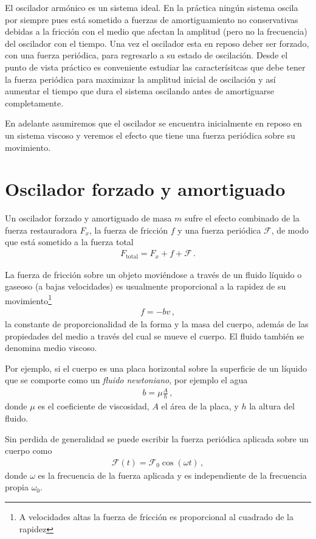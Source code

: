 El oscilador armónico es un sistema ideal. En la práctica ningún sistema oscila por siempre pues está sometido a fuerzas de amortiguamiento no conservativas debidas a la fricción con el medio que afectan la amplitud (pero no la frecuencia) del oscilador con el tiempo. Una vez el oscilador esta en reposo deber ser forzado, con una fuerza periódica, para regresarlo a su estado de oscilación. Desde el punto de vista práctico es conveniente estudiar las caracterísitcas que debe tener la fuerza periódica para maximizar la amplitud inicial de oscilación y así aumentar el tiempo que dura el sistema oscilando antes de amortiguarse completamente. 

En adelante asumiremos que el oscilador se encuentra inicialmente en reposo en un sistema viscoso y veremos el efecto que tiene una fuerza periódica sobre su movimiento.

\section{Oscilador forzado y amortiguado}
Un oscilador forzado y amortiguado de masa $m$ sufre el efecto combinado de la fuerza restauradora $F_x$, la fuerza de fricción $f$ y una fuerza periódica $\mathcal{F}$, de modo que está sometido a la fuerza total
\begin{align*}
  F_{\text{total}}=F_x+f+\mathcal{F}\,.
\end{align*}

La fuerza de fricción sobre un objeto moviéndose a través de un fluido líquido o gaseoso  (a bajas velocidades) es usualmente proporcional a la rapidez de su movimiento\footnote{A velocidades altas la fuerza de fricción es proporcional al cuadrado de la rapidez}
\begin{align*}
  f=-b v\,,
\end{align*}
la constante de proporcionalidad de la forma y la masa del cuerpo, además de las propiedades del medio a través del cual se mueve el cuerpo. El fluido también se denomina medio viscoso. 

Por ejemplo, si el cuerpo es una placa horizontal sobre la superficie de un líquido que se comporte como un \emph{fluido newtoniano}, por ejemplo el agua
\begin{align*}
  b=\mu\frac{A}{h}\,,
\end{align*}
donde $\mu$ es el coeficiente de viscosidad, $A$ el área de la placa, y $h$ la altura del fluido.

Sin perdida de generalidad se puede escribir la fuerza periódica aplicada sobre un cuerpo como
\begin{align*}
  \mathcal{F}(t)=\mathcal{F}_0\cos(\omega t)\,,
\end{align*}
donde $\omega$ es la frecuencia de la fuerza aplicada y es independiente de la frecuencia propia $\omega_0$. 

